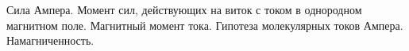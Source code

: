\documentclass[__main__.tex]{subfiles}
\begin{document}
Сила Ампера. Момент сил, действующих на виток с током в однородном магнитном поле. Магнитный момент тока. Гипотеза молекулярных токов Ампера. Намагниченность.\\ 

\end{document}
